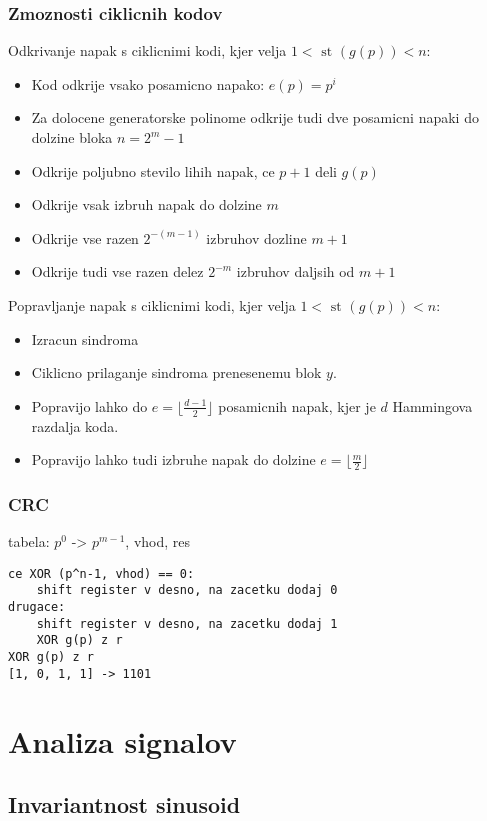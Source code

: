 \documentclass{article}
\begin{document}
\begin{multicols}{4}
\subsubsection{Zmoznosti ciklicnih kodov}
Odkrivanje napak s ciklicnimi kodi, kjer velja $1 < \text{ st }(g(p)) < n$:
\begin{itemize}
    \item Kod odkrije vsako posamicno napako: $e(p) = p^i$
    \item Za dolocene generatorske polinome odkrije tudi dve posamicni napaki do dolzine bloka $n = 2^m -1$
    \item Odkrije poljubno stevilo lihih napak, ce $p + 1$ deli $g(p)$
    \item Odkrije vsak izbruh napak do dolzine $m$
    \item Odkrije vse razen $2^{-(m-1)}$ izbruhov dozline $m + 1$
    \item Odkrije tudi vse razen delez $2^{-m}$ izbruhov daljsih od $m + 1$
\end{itemize}
Popravljanje napak s ciklicnimi kodi, kjer velja $1 < \text{ st }(g(p)) < n$:
\begin{itemize}
    \item Izracun sindroma
    \item Ciklicno prilaganje sindroma prenesenemu blok $y$.
    \item Popravijo lahko do $e = \lfloor \frac{d-1}{2} \rfloor$ posamicnih napak, kjer je
        $d$ Hammingova razdalja koda.
    \item Popravijo lahko tudi izbruhe napak do dolzine $e = \lfloor \frac{m}{2} \rfloor$
\end{itemize}

\subsubsection{CRC}
tabela: $p^0$ -> $p^{m-1}$, vhod, res
\begin{verbatim}
ce XOR (p^n-1, vhod) == 0:
    shift register v desno, na zacetku dodaj 0
drugace:
    shift register v desno, na zacetku dodaj 1
    XOR g(p) z r
XOR g(p) z r
[1, 0, 1, 1] -> 1101
\end{verbatim}

\section{Analiza signalov}

\subsection{Invariantnost sinusoid}


\end{multicols}
\end{document}
